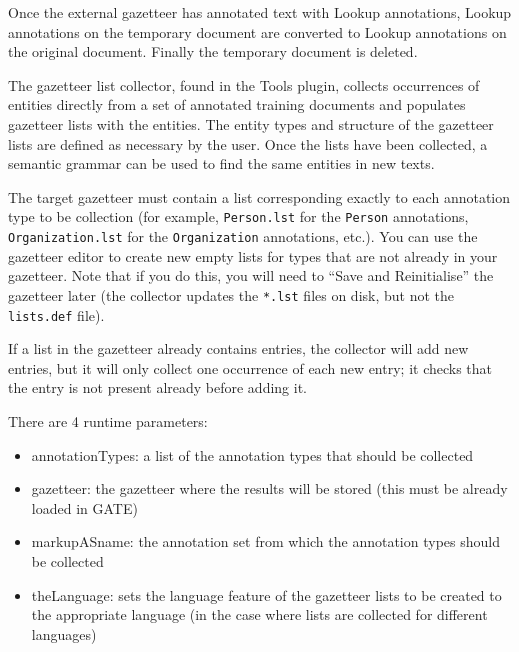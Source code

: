 Once the external gazetteer has annotated text with Lookup annotations, Lookup
annotations on the temporary document are converted to Lookup annotations on the
original document. Finally the temporary document is deleted.

The gazetteer list collector, found in the Tools plugin, collects occurrences of
entities directly from a set of annotated training documents and populates
gazetteer lists with the entities. The entity types and structure of the
gazetteer lists are defined as necessary by the user. Once the lists have been
collected, a semantic grammar can be used to find the same entities in new
texts.

The target gazetteer must contain a list corresponding exactly to each
annotation type to be collection (for example, \texttt{Person.lst} for the
\texttt{Person} annotations, \texttt{Organization.lst} for the
\texttt{Organization} annotations, etc.).  You can use the gazetteer editor to
create new empty lists for types that are not already in your gazetteer.  Note
that if you do this, you will need to ``Save and Reinitialise'' the gazetteer
later (the collector updates the \texttt{*.lst} files on disk, but not the
\texttt{lists.def} file).

If a list in the gazetteer already contains entries, the collector will add new
entries, but it will only collect one occurrence of each new entry; it checks
that the entry is not present already before adding it.


There are 4 runtime parameters:
\begin{itemize}
\item annotationTypes: a list of the annotation types that should be collected
\item gazetteer: the gazetteer where the results will be stored (this must be
  already loaded in GATE)
\item markupASname: the annotation set from which the annotation types should be
  collected
\item theLanguage: sets the language feature of the gazetteer lists to be
  created to the appropriate language (in the case where lists are collected for
  different languages)
\end{itemize}

